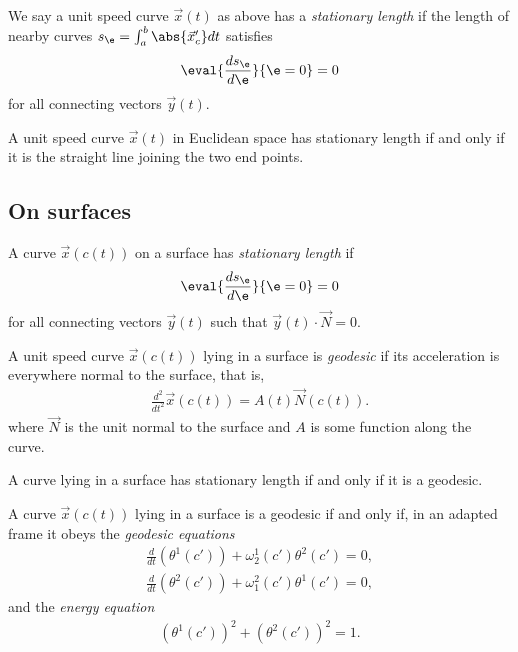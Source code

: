 \documentclass{article}
\begin{document}
\begin{definition}
    We say a unit speed curve $\vec x(t)$ as above has a \emph{stationary length} if
    the length of nearby curves $s_\e = \int_a^b \abs{\vec x'_c} dt$ satisfies
    \begin{align*}
        \eval{\frac{ds_\e}{d\e }}{\e=0}=0
    \end{align*}
    for all connecting vectors $\vec y(t)$.
\end{definition}

\begin{proposition}[Notes 12.3]
    A unit speed curve $\vec x(t)$ in Euclidean space has stationary length if and only if
    it is the straight line joining the two end points.
\end{proposition}

\subsection{On surfaces}

\begin{definition}
    A curve $\vec x(c(t))$ on a surface has \emph{stationary length} if
    \begin{align*}
        \eval{\frac{ds_\e}{d\e}}{\e=0}=0
    \end{align*}
    for all connecting vectors $\vec y(t)$ such that $\vec y(t)\cdot\vec N=0$.
\end{definition}

\begin{definition}
    A unit speed curve $\vec x(c(t))$ lying in a surface is \emph{geodesic} if its acceleration
    is everywhere normal to the surface, that is,
    \begin{align*}
        \frac{d^2}{dt^2}\vec x(c(t)) = A(t)\vec N(c(t)).
    \end{align*}
    where $\vec N$ is the unit normal to the surface and $A$ is some function along the curve.
\end{definition}

\begin{proposition}[Notes 12.7]
    A curve lying in a surface has stationary length if and only if it is a geodesic.
\end{proposition}

\begin{proposition}[Notes 12.9]
    A curve $\vec x(c(t))$ lying in a surface is a geodesic if and only if, in an adapted frame
    it obeys the \emph{geodesic equations}
    \begin{align*}
        \frac{d}{dt}(\theta^1 (c')) + \omega_2^1(c')\theta^2(c') = 0, \\
        \frac{d}{dt}(\theta^2 (c')) + \omega_1^2(c')\theta^1(c') = 0,
    \end{align*}
    and the \emph{energy equation}
    \begin{align*}
        (\theta^1(c'))^2 + (\theta^2(c'))^2 = 1.
    \end{align*}
\end{proposition}
\end{document}

